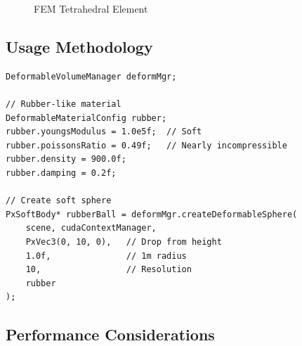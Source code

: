 \begin{figure}[h]
\centering
{}
\caption{FEM Tetrahedral Element}
\end{figure}


\subsection{Usage Methodology}

\begin{lstlisting}[caption={Creating soft rubber ball}]
DeformableVolumeManager deformMgr;

// Rubber-like material
DeformableMaterialConfig rubber;
rubber.youngsModulus = 1.0e5f;  // Soft
rubber.poissonsRatio = 0.49f;   // Nearly incompressible
rubber.density = 900.0f;
rubber.damping = 0.2f;

// Create soft sphere
PxSoftBody* rubberBall = deformMgr.createDeformableSphere(
    scene, cudaContextManager,
    PxVec3(0, 10, 0),   // Drop from height
    1.0f,               // 1m radius
    10,                 // Resolution
    rubber
);
\end{lstlisting}


\subsection{Performance Considerations}

